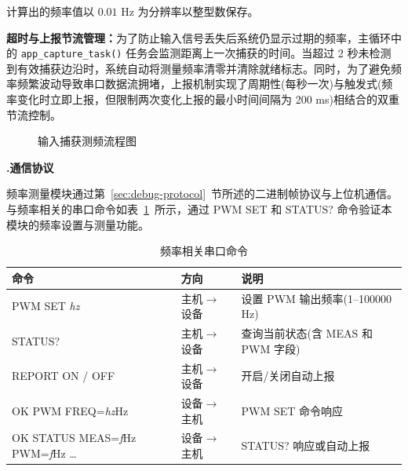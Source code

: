 \documentclass[UTF8,a4paper,zihao=-4,fontset=macnew]{ctexart}
\makeatletter
\def\@extractsubnum#1.#2\@nil{#2}
\newcommand{\subsectiontitle}[2]{%
  \setcounter{subsection}{\numexpr\@extractsubnum#1\@nil-1\relax}\refstepcounter{subsection}%
  \vspace{0.34cm}%
  {\noindent\heiti\bfseries\fontsize{16pt}{18pt}\selectfont #1.\quad #2\par}%
  \vspace{0.54cm}%
}
\makeatother
\begin{document}
计算出的频率值以 $0.01$ Hz 为分辨率以整型数保存。

\textbf{超时与上报节流管理：}为了防止输入信号丢失后系统仍显示过期的频率，主循环中的 \texttt{app\_capture\_task()} 任务会监测距离上一次捕获的时间。当超过 2 秒未检测到有效捕获边沿时，系统自动将测量频率清零并清除就绪标志。同时，为了避免频率频繁波动导致串口数据流拥堵，上报机制实现了周期性(每秒一次)与触发式(频率变化时立即上报，但限制两次变化上报的最小时间间隔为 200 ms)相结合的双重节流控制。

\begin{figure}[H]
\centering
{}
\caption{输入捕获测频流程图}
\label{fig:capture-flow}
\end{figure}

\subsectiontitle{4.3}{通信协议}
\label{sec:frequency-protocol}

频率测量模块通过第~\ref{sec:debug-protocol}~节所述的二进制帧协议与上位机通信。与频率相关的串口命令如表~\ref{tab:freq-commands}~所示，通过 PWM SET 和 STATUS? 命令验证本模块的频率设置与测量功能。

\begin{table}[H]
\centering
{}
\caption{频率相关串口命令}
\label{tab:freq-commands}
\begin{tabular}{lll}
\toprule
命令 & 方向 & 说明 \\
\midrule
PWM SET \textit{hz} & 主机$\rightarrow$设备 & 设置 PWM 输出频率(1--100000 Hz) \\
STATUS? & 主机$\rightarrow$设备 & 查询当前状态(含 MEAS 和 PWM 字段) \\
REPORT ON / OFF & 主机$\rightarrow$设备 & 开启/关闭自动上报 \\
OK PWM FREQ=\textit{hz}Hz & 设备$\rightarrow$主机 & PWM SET 命令响应 \\
OK STATUS MEAS=\textit{f}Hz PWM=\textit{f}Hz \ldots & 设备$\rightarrow$主机 & STATUS? 响应或自动上报 \\
\bottomrule
\end{tabular}
\end{table}
\end{document}
